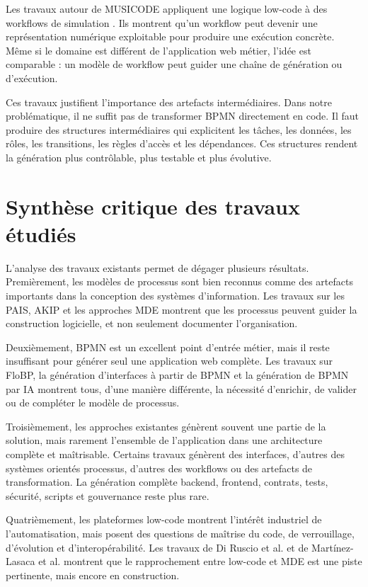 \documentclass[12pt,a4paper]{article}
\begin{document}
Les travaux autour de MUSICODE appliquent une logique low-code à des workflows de simulation \cite{musicode2025}. Ils montrent qu'un workflow peut devenir une représentation numérique exploitable pour produire une exécution concrète. Même si le domaine est différent de l'application web métier, l'idée est comparable : un modèle de workflow peut guider une chaîne de génération ou d'exécution.

Ces travaux justifient l'importance des artefacts intermédiaires. Dans notre problématique, il ne suffit pas de transformer BPMN directement en code. Il faut produire des structures intermédiaires qui explicitent les tâches, les données, les rôles, les transitions, les règles d'accès et les dépendances. Ces structures rendent la génération plus contrôlable, plus testable et plus évolutive.

\section{Synthèse critique des travaux étudiés}

L'analyse des travaux existants permet de dégager plusieurs résultats. Premièrement, les modèles de processus sont bien reconnus comme des artefacts importants dans la conception des systèmes d'information. Les travaux sur les PAIS, AKIP et les approches MDE montrent que les processus peuvent guider la construction logicielle, et non seulement documenter l'organisation.

Deuxièmement, BPMN est un excellent point d'entrée métier, mais il reste insuffisant pour générer seul une application web complète. Les travaux sur FloBP, la génération d'interfaces à partir de BPMN et la génération de BPMN par IA montrent tous, d'une manière différente, la nécessité d'enrichir, de valider ou de compléter le modèle de processus.

Troisièmement, les approches existantes génèrent souvent une partie de la solution, mais rarement l'ensemble de l'application dans une architecture complète et maîtrisable. Certains travaux génèrent des interfaces, d'autres des systèmes orientés processus, d'autres des workflows ou des artefacts de transformation. La génération complète backend, frontend, contrats, tests, sécurité, scripts et gouvernance reste plus rare.

Quatrièmement, les plateformes low-code montrent l'intérêt industriel de l'automatisation, mais posent des questions de maîtrise du code, de verrouillage, d'évolution et d'interopérabilité. Les travaux de Di Ruscio et al. et de Martínez-Lasaca et al. montrent que le rapprochement entre low-code et MDE est une piste pertinente, mais encore en construction.
\end{document}
